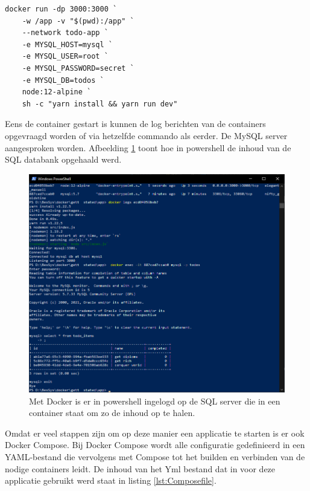 \begin{lstlisting}
docker run -dp 3000:3000 `
    -w /app -v "$(pwd):/app" `
    --network todo-app `
    -e MYSQL_HOST=mysql `
    -e MYSQL_USER=root `
    -e MYSQL_PASSWORD=secret `
    -e MYSQL_DB=todos `
    node:12-alpine `
    sh -c "yarn install && yarn run dev"
\end{lstlisting}
Eens de container gestart is kunnen de log berichten van de containers opgevraagd worden of via hetzelfde commando als eerder. De MySQL server aangesproken worden. Afbeelding \ref{fig:powershellsql} toont hoe in powershell de inhoud van de SQL databank opgehaald werd.
\begin{figure}[h]
    \includegraphics[width=\linewidth]{img/sqlquery.png}
    \caption[Het aanspreken van een SQL server binnen een container]{Met Docker is er in powershell ingelogd op de SQL server die in een container staat om zo de inhoud op te halen.}
    \label{fig:powershellsql}
    \centering
\end{figure}

Omdat er veel stappen zijn om op deze manier een applicatie te starten is er ook Docker Compose. Bij Docker Compose wordt alle configuratie gedefinieerd in een YAML-bestand die vervolgens met Compose tot het builden en verbinden van de nodige containers leidt. De inhoud van het Yml bestand dat in voor deze applicatie gebruikt werd staat in listing \ref{lst:Composefile}.

